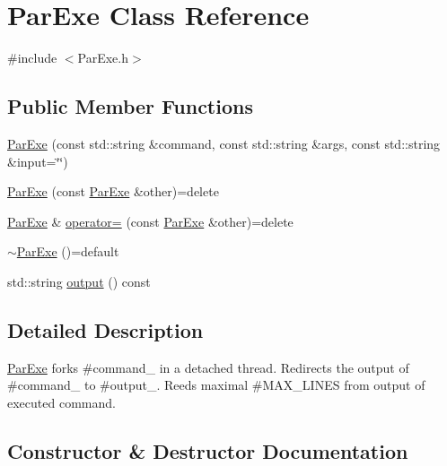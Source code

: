 \hypertarget{class_par_exe}{}\section{Par\+Exe Class Reference}
\label{class_par_exe}


{\ttfamily \#include $<$Par\+Exe.\+h$>$}

\subsection*{Public Member Functions}
\begin{DoxyCompactItemize}
\item 
\hyperlink{class_par_exe_a8cc79409b6f5cdb1bd98d595618e245e}{Par\+Exe} (const std\+::string \&command, const std\+::string \&args, const std\+::string \&input=\char`\"{}\char`\"{})
\item 
\hyperlink{class_par_exe_a78f0aa6a835dbb958fc29abd3457d414}{Par\+Exe} (const \hyperlink{class_par_exe}{Par\+Exe} \&other)=delete
\item 
\hyperlink{class_par_exe}{Par\+Exe} \& \hyperlink{class_par_exe_a200814420e4d2e6f3128c761789d0f1a}{operator=} (const \hyperlink{class_par_exe}{Par\+Exe} \&other)=delete
\item 
\hyperlink{class_par_exe_a6b7cfc33ef1b4afa98ac41a89cff1fd7}{$\sim$\+Par\+Exe} ()=default
\item 
std\+::string \hyperlink{class_par_exe_aa988c933599f973a6641a157331efb1a}{output} () const 
\end{DoxyCompactItemize}


\subsection{Detailed Description}
\hyperlink{class_par_exe}{Par\+Exe} forks \#command\+\_\+ in a detached thread. Redirects the output of \#command\+\_\+ to \#output\+\_\+. Reeds maximal \#\+M\+A\+X\+\_\+\+L\+I\+N\+ES from output of executed command. 

\subsection{Constructor \& Destructor Documentation}
